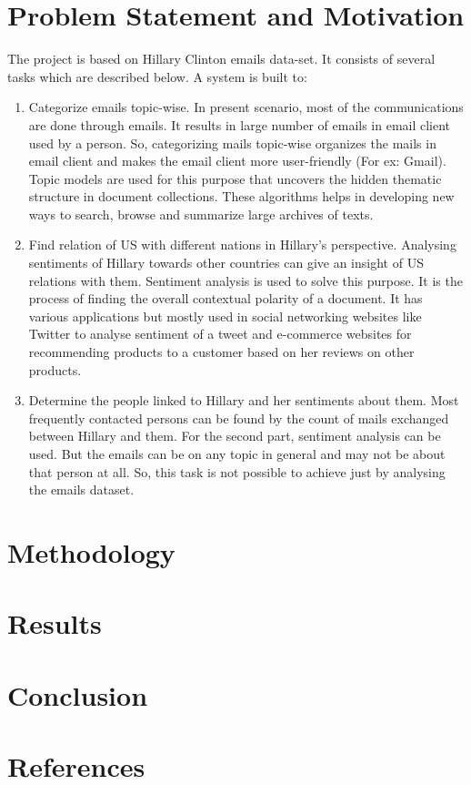 \documentclass[12pt]{article}
\begin{document}
	\maketitle
\section{Problem Statement and Motivation}
The project is based on Hillary Clinton emails data-set. It consists of several tasks which are described below. A system is built to:
\begin{enumerate}
	\item Categorize emails topic-wise. In present scenario, most of the communications are done through emails. It results in large number of emails in email client used by a person. So, categorizing mails topic-wise organizes the mails in email client and makes the email client more user-friendly (For ex: Gmail). Topic models are used for this purpose that uncovers the hidden thematic structure in document collections. These algorithms helps in developing new ways to search, browse and summarize large archives of texts.
	\item Find relation of US with different nations in Hillary's perspective. Analysing sentiments of Hillary towards other countries can give an insight of US relations with them. Sentiment analysis is used to solve this purpose. It is the process of finding the overall contextual polarity of a document. It has various applications but mostly used in social networking websites like Twitter to analyse sentiment of a tweet and e-commerce websites for recommending products to a customer based on her reviews on other products.
	\item Determine the people linked to Hillary and her sentiments about them. Most frequently contacted persons can be found by the count of mails exchanged between Hillary and them. For the second part, sentiment analysis can be used. But the emails can be on any topic in general and may not be about that person at all. So, this task is not possible to achieve just by analysing the emails dataset.
\end{enumerate}
\section{Methodology}
\section{Results}
\section{Conclusion}
\section{References}
	
\end{document}
